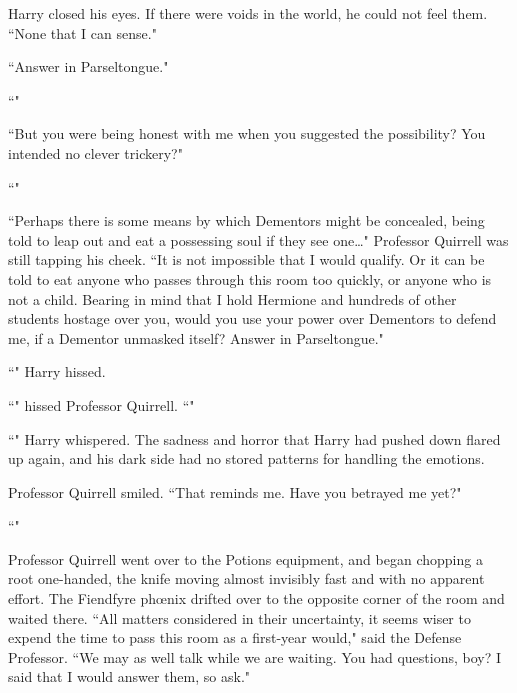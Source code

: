 Harry closed his eyes. If there were voids in the world, he could not feel them. ``None that I can sense."

``Answer in Parseltongue."

``"

``But you were being honest with me when you suggested the possibility? You intended no clever trickery?"

``"

``Perhaps there is some means by which Dementors might be concealed, being told to leap out and eat a possessing soul if they see one{\ldots}" Professor Quirrell was still tapping his cheek. ``It is not impossible that I would qualify. Or it can be told to eat anyone who passes through this room too quickly, or anyone who is not a child. Bearing in mind that I hold Hermione and hundreds of other students hostage over you, would you use your power over Dementors to defend me, if a Dementor unmasked itself? Answer in Parseltongue."

``" Harry hissed.

``" hissed Professor Quirrell. ``"

``" Harry whispered. The sadness and horror that Harry had pushed down flared up again, and his dark side had no stored patterns for handling the emotions. 

Professor Quirrell smiled. ``That reminds me. Have you betrayed me yet?"

``"

Professor Quirrell went over to the Potions equipment, and began chopping a root one-handed, the knife moving almost invisibly fast and with no apparent effort. The Fiendfyre phœnix drifted over to the opposite corner of the room and waited there. ``All matters considered in their uncertainty, it seems wiser to expend the time to pass this room as a first-year would," said the Defense Professor. ``We may as well talk while we are waiting. You had questions, boy? I said that I would answer them, so ask."

